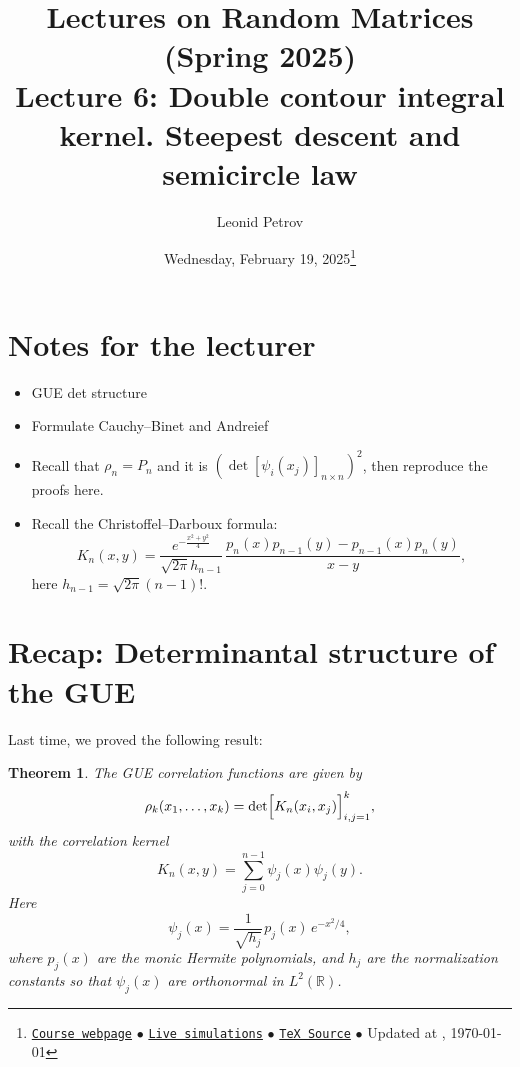 \documentclass[letterpaper,11pt,oneside,reqno]{article}
\numberwithin{equation}{section}
\newcommand{\ssp}{\hspace{1pt}}
\newtheorem{theorem}[proposition]{Theorem}
\theoremstyle{definition}
\newenvironment{lnotes}{\section*{Notes for the lecturer}}{}
\begin{document}
\title{Lectures on Random Matrices
(Spring 2025)
\\Lecture 6: Double contour integral kernel. Steepest descent and semicircle law}

\date{Wednesday, February 19, 2025\footnote{\href{https://lpetrov.cc/rmt25/}{\texttt{Course webpage}}
$\bullet$ \href{https://lpetrov.cc/simulations/model/random-matrices/}{\texttt{Live simulations}}
$\bullet$ \href{https://lpetrov.cc/rmt25/rmt25-notes/rmt2025-l06.tex}{\texttt{TeX Source}}
$\bullet$
Updated at \currenttime, \today}}

\author{Leonid Petrov}

\maketitle
\tableofcontents

\begin{lnotes}

\begin{itemize}
	\item GUE det structure

	\item Formulate Cauchy--Binet and Andreief

	\item Recall that $\rho_n=P_n$ and it is
	$\left( \det[\psi_i(x_j)]_{n\times n} \right)^2$, then reproduce the proofs here.

	\item Recall the Christoffel--Darboux formula:
	\begin{equation*}
		K_n(x,y)=\frac{e^{-\frac{x^2+y^2}{4}}}{\sqrt{2\pi}
		h_{n-1}}\,\frac{p_n(x)p_{n-1}(y)-p_{n-1}(x)p_n(y)}{x-y},
	\end{equation*}
	here $h_{n-1}=\sqrt{2\pi}(n-1)!$.
\end{itemize}

\end{lnotes}

\section{Recap: Determinantal structure of the GUE}

Last time, we proved the following result:
\begin{theorem}
\label{thm:determinantal_GUE}
The GUE correlation functions are given by
\[
\rho_k(x_1,\dots,x_k)=\det\Bigl[K_n(x_i,x_j)\Bigr]_{i,j=1}^k,
\]
with the correlation kernel
\[
K_n(x,y)=\sum_{j=0}^{n-1}\psi_j(x)\psi_j(y).
\]
Here
\begin{equation*}
	\psi_j(x)=\frac{1}{\sqrt{h_j}}\ssp p_j(x)\,e^{-x^2/4},
\end{equation*}
where \(p_j(x)\) are the monic Hermite polynomials, and \(h_j\) are the normalization constants so that
$\psi_j(x)$ are orthonormal in $L^2(\mathbb{R})$.
\end{theorem}
\end{document}
